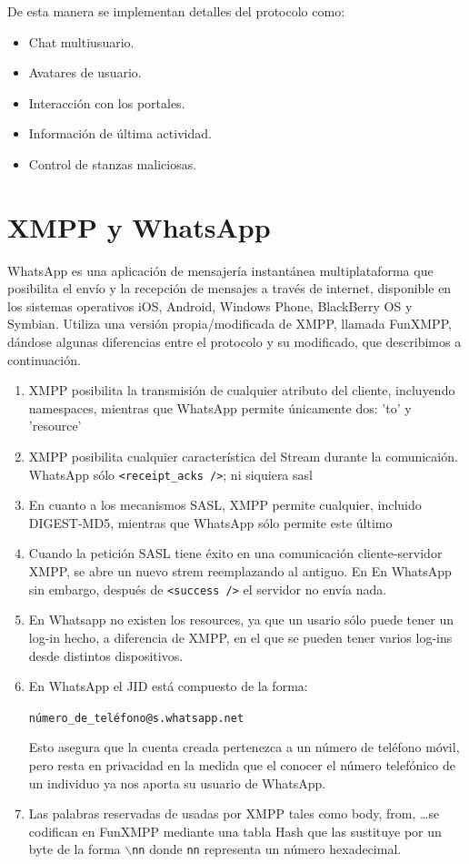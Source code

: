 \documentclass[a4paper, 11pt]{article} %
\begin{document}
    De esta manera se implementan detalles del protocolo como:
    \begin{itemize}
     \item Chat multiusuario.
     \item Avatares de usuario.
     \item Interacción con los portales.
     \item Información de última actividad.
     \item Control de stanzas maliciosas.
    \end{itemize}

\section{XMPP y WhatsApp}
WhatsApp es una aplicación de mensajería instantánea multiplataforma que posibilita el envío y la recepción de mensajes a 
través de internet, disponible en los sistemas operativos iOS, Android, Windows Phone, BlackBerry OS y Symbian. Utiliza una
versión propia/modificada de XMPP, llamada FunXMPP, dándose algunas diferencias entre el protocolo y su modificado, que
describimos a continuación.

\begin{enumerate}
 \item XMPP posibilita la transmisión de cualquier atributo del cliente, incluyendo namespaces, mientras que WhatsApp
  permite únicamente dos: 'to' y 'resource' %
 \item XMPP posibilita cualquier característica del Stream durante la comunicaión. WhatsApp sólo \texttt{<receipt\_acks />};
  ni siquiera sasl
 \item En cuanto a los mecanismos SASL, XMPP permite cualquier, incluido DIGEST-MD5, mientras que WhatsApp sólo permite 
  este último
 \item Cuando la petición SASL tiene éxito en una comunicación cliente-servidor XMPP, se abre un nuevo strem reemplazando al antiguo. En
  En WhatsApp sin embargo, después de \texttt{<success />} el servidor no envía nada.
 \item En Whatsapp no existen los resources, ya que un usario sólo puede tener un log-in hecho, a diferencia de XMPP, en
  el que se pueden tener varios log-ins desde distintos dispositivos.
 \item En WhatsApp el JID está compuesto de la forma:
   \begin{center}
    \texttt{número\_de\_teléfono@s.whatsapp.net}
   \end{center}
  Esto asegura que la cuenta creada pertenezca a un número de teléfono móvil, pero resta en privacidad en la medida
  que el conocer el número telefónico de un individuo ya nos aporta su usuario de WhatsApp.
 \item Las palabras reservadas de usadas por XMPP tales como body, from, \ldots se codifican en FunXMPP mediante
  una tabla Hash que las sustituye por un byte de la forma $\backslash$\texttt{nn} donde \texttt{nn} representa un número
  hexadecimal.
\end{enumerate}
\end{document}
